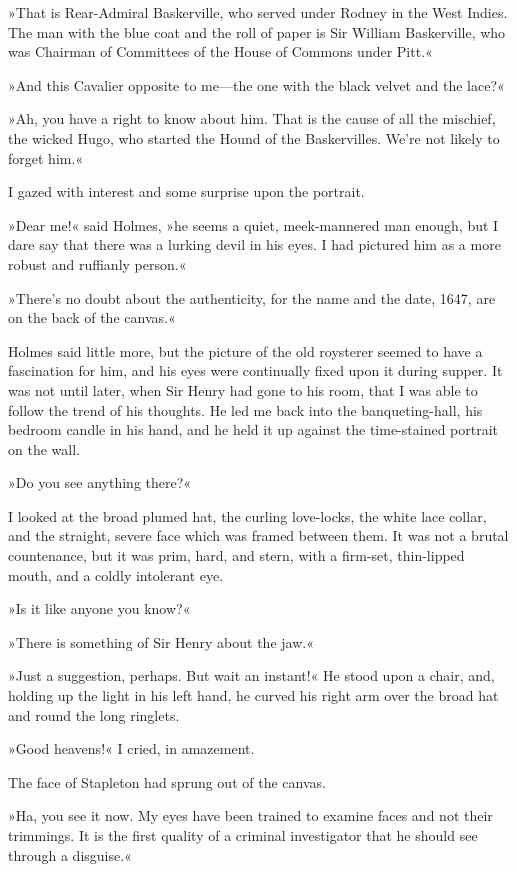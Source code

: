 »That is Rear-Admiral Baskerville, who served under Rodney in the West Indies. The man with the blue coat and the roll of paper is Sir William Baskerville, who was Chairman of Committees of the House of Commons under Pitt.«


»And this Cavalier opposite to me—the one with the black velvet and the lace?«

»Ah, you have a right to know about him. That is the cause of all the mischief, the wicked Hugo, who started the Hound of the Baskervilles. We're not likely to forget him.«

I gazed with interest and some surprise upon the portrait.

»Dear me!« said Holmes, »he seems a quiet, meek-mannered man enough, but I dare say that there was a lurking devil in his eyes. I had pictured him as a more robust and ruffianly person.«

»There's no doubt about the authenticity, for the name and the date, 1647, are on the back of the canvas.«

Holmes said little more, but the picture of the old roysterer seemed to have a fascination for him, and his eyes were continually fixed upon it during supper. It was not until later, when Sir Henry had gone to his room, that I was able to follow the trend of his thoughts. He led me back into the banqueting-hall, his bedroom candle in his hand, and he held it up against the time-stained portrait on the wall.

»Do you see anything there?«

I looked at the broad plumed hat, the curling love-locks, the white lace collar, and the straight, severe face which was framed between them. It was not a brutal countenance, but it was prim, hard, and stern, with a firm-set, thin-lipped mouth, and a coldly intolerant eye.

»Is it like anyone you know?«

»There is something of Sir Henry about the jaw.«

»Just a suggestion, perhaps. But wait an instant!« He stood upon a chair, and, holding up the light in his left hand, he curved his right arm over the broad hat and round the long ringlets.

»Good heavens!« I cried, in amazement.

The face of Stapleton had sprung out of the canvas.

»Ha, you see it now. My eyes have been trained to examine faces and not their trimmings. It is the first quality of a criminal investigator that he should see through a disguise.«

